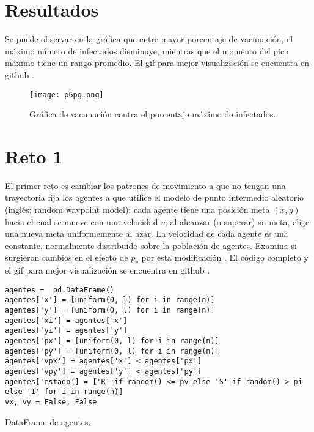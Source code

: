 \documentclass{article}
\begin{document}
\section{Resultados}
Se puede observar en la gráfica que entre mayor porcentaje de vacunación, el máximo número de infectados disminuye, mientras que el momento del pico máximo tiene un rango promedio. El gif para mejor visualización se encuentra en github \cite{Denisse_Leyva}.

\begin{figure}[H]
\centering
\texttt{[image: p6pg.png]}
\caption{\label{fig3}Gráfica de vacunación contra el porcentaje máximo de infectados.}
\end{figure}

\section{Reto 1}
El primer reto es cambiar los patrones de movimiento a que no tengan una trayectoria fija los agentes a que utilice el modelo de punto intermedio aleatorio (inglés: random waypoint model): cada agente tiene una posición meta $(x,y)$ hacia el cual se mueve con una velocidad $v$; al alcanzar (o superar) su meta, elige una nueva meta uniformemente al azar. La velocidad de cada agente es una constante, normalmente distribuido sobre la población de agentes. Examina si surgieron cambios en el efecto de $p_{v}$ por esta modificación \cite{Satu_Elisa_Schaeffer}. El código completo y el gif para mejor visualización se encuentra en github \cite{Denisse_Leyva}.

\renewcommand{\listingscaption}{Código}
\begin{listing}[H]
  \begin{verbatim}
agentes =  pd.DataFrame()
agentes['x'] = [uniform(0, l) for i in range(n)]
agentes['y'] = [uniform(0, l) for i in range(n)]
agentes['xi'] = agentes['x']
agentes['yi'] = agentes['y']
agentes['px'] = [uniform(0, l) for i in range(n)]
agentes['py'] = [uniform(0, l) for i in range(n)]
agentes['vpx'] = agentes['x'] < agentes['px']
agentes['vpy'] = agentes['y'] < agentes['py']
agentes['estado'] = ['R' if random() <= pv else 'S' if random() > pi else 'I' for i in range(n)]
vx, vy = False, False
  \end{verbatim}
  \label{lst:fibo}
  \caption{DataFrame de agentes.}
\end{listing}
\end{document}
